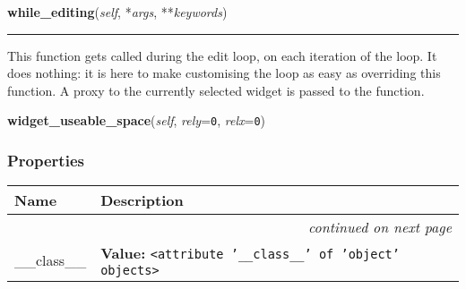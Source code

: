     \label{npyscreen:Form:Form:while_editing}
    
    \vspace{0.5ex}

    \begin{boxedminipage}{\textwidth}

    \raggedright \textbf{while\_editing}(\textit{self}, *\textit{args}, **\textit{keywords})

    \vspace{-1.5ex}

    \rule{\textwidth}{0.5\fboxrule}
    This function gets called during the edit loop, on each iteration of 
    the loop.  It does nothing: it is here to make customising the loop as 
    easy as overriding this function. A proxy to the currently selected 
    widget is passed to the function.

    \vspace{1ex}

    \end{boxedminipage}

    \label{npyscreen:screen_area:ScreenArea:widget_useable_space}

    \vspace{0.5ex}

    \begin{boxedminipage}{\textwidth}

    \raggedright \textbf{widget\_useable\_space}(\textit{self}, \textit{rely}=\texttt{0}, \textit{relx}=\texttt{0})

    \end{boxedminipage}



  \subsubsection{Properties}

\begin{longtable}{|p{}|p{}|l}
\cline{1-2}
\cline{1-2} \centering \textbf{Name} & \centering \textbf{Description}& \\
\cline{1-2}
\endhead\cline{1-2}\multicolumn{3}{r}{\small\textit{continued on next page}}\\\endfoot\cline{1-2}
\endlastfoot\raggedright \_\-\_\-c\-l\-a\-s\-s\-\_\-\_\- & \raggedright \textbf{Value:} 
{\tt {\textless}attribute '\_\_class\_\_' of 'object' objects{\textgreater}}&\\
\cline{1-2}
\end{longtable}


